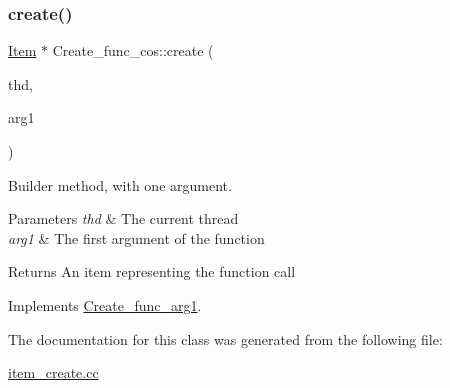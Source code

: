 \subsubsection{\texorpdfstring{create()}{create()}}
{\footnotesize\ttfamily \mbox{\hyperlink{classItem}{Item}} $\ast$ Create\+\_\+func\+\_\+cos\+::create (\begin{DoxyParamCaption}\item[{T\+HD $\ast$}]{thd,  }\item[{\mbox{\hyperlink{classItem}{Item}} $\ast$}]{arg1 }\end{DoxyParamCaption})\hspace{0.3cm}{\ttfamily [virtual]}}

Builder method, with one argument. 
\begin{DoxyParams}{Parameters}
{\em thd} & The current thread \\
\hline
{\em arg1} & The first argument of the function \\
\hline
\end{DoxyParams}
\begin{DoxyReturn}{Returns}
An item representing the function call 
\end{DoxyReturn}


Implements \mbox{\hyperlink{classCreate__func__arg1_a3e9a98f755cd82c3e762e334c955a8c9}{Create\+\_\+func\+\_\+arg1}}.



The documentation for this class was generated from the following file\+:\begin{DoxyCompactItemize}
\item 
\mbox{\hyperlink{item__create_8cc}{item\+\_\+create.\+cc}}\end{DoxyCompactItemize}
